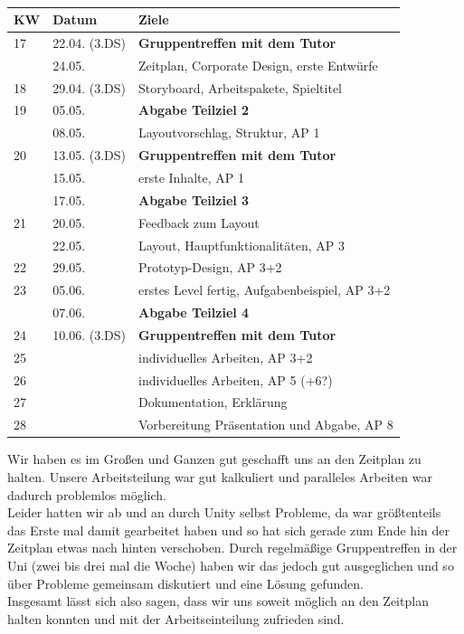 \documentclass[10pt,a4paper,notitlepage]{report}
\begin{document}
	\clearpage
	\marginpar{\vspace{3.0mm} \color{orange}\rule{0.8mm}{53.3mm} \\[3mm] \color{hellorange}\rule{0.8mm}{170mm}}
	\par\bigskip

	\\\par\medskip\Text
\begin{center}
		\begin{tabular}{l|l|l}\hline
 	 KW & Datum & Ziele\\\hline
	17 & 22.04. (3.DS) & \textbf{Gruppentreffen mit dem Tutor}\\
	& 24.05. & Zeitplan, Corporate Design, erste Entwürfe\\\hline
	18 & 29.04. (3.DS) &  Storyboard, Arbeitspakete, Spieltitel\\\hline
	19 & 05.05. & \textbf{Abgabe Teilziel 2}\\
	& 08.05.& Layoutvorschlag, Struktur, AP 1\\\hline
	20 & 13.05. (3.DS) & \textbf{Gruppentreffen mit dem Tutor}\\
	& 15.05. & erste Inhalte, AP 1\\
	& 17.05. & \textbf{Abgabe Teilziel 3}\\\hline
	21 & 20.05. & Feedback zum Layout\\
	& 22.05. & Layout, Hauptfunktionalitäten, AP 3\\\hline
	22 & 29.05. & Prototyp-Design, AP 3+2 \\\hline
	23 & 05.06. & erstes Level fertig, Aufgabenbeispiel, AP 3+2\\
	& 07.06. & \textbf{Abgabe Teilziel 4}\\\hline
	24 & 10.06. (3.DS) & \textbf{Gruppentreffen mit dem Tutor}\\\hline
	25 & & individuelles Arbeiten, AP 3+2\\\hline
	26 & & individuelles Arbeiten, AP 5 (+6?)\\\hline
	27 & & Dokumentation, Erklärung\\\hline
	28 & & Vorbereitung Präsentation und Abgabe, AP 8\\\hline
	\end{tabular}
	\end{center}
	\par\bigskip
	Wir haben es im Großen und Ganzen gut geschafft uns an den Zeitplan zu halten. Unsere Arbeitsteilung war gut kalkuliert und paralleles Arbeiten war dadurch problemlos möglich.\\
	Leider hatten wir ab und an durch Unity selbst Probleme, da war größtenteils das Erste mal damit gearbeitet haben und so hat sich gerade zum Ende hin der Zeitplan etwas nach hinten verschoben. Durch regelmäßige Gruppentreffen in der Uni (zwei bis drei mal die Woche) haben wir das jedoch gut ausgeglichen und so über Probleme gemeinsam diskutiert und eine Lösung gefunden.\\
	Insgesamt lässt sich also sagen, dass wir uns soweit möglich an den Zeitplan halten konnten und mit der Arbeitseinteilung zufrieden sind.\\\par\smallskip
	
\end{document}

